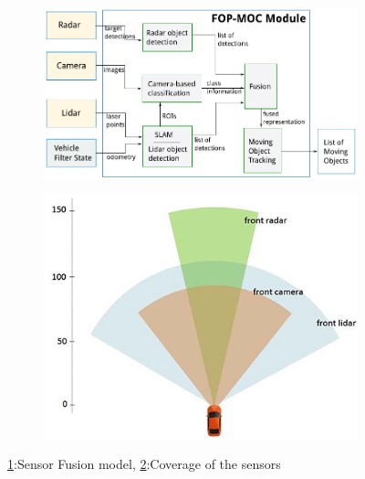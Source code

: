 \begin{figure}
    \centering
    \begin{subfigure}[b]{0.4\textwidth}
        \includegraphics[width=\textwidth]{src/pic/PS.png}
        \caption{}
        \label{fig:PS}
    \end{subfigure}
    \begin{subfigure}[b]{0.4\textwidth}
        \includegraphics[width=\textwidth]{src/pic/sensor_covarage_front.png}
        \caption{}
        \label{fig:sensorcovarage}
    \end{subfigure}
    \caption{\ref{fig:PS}:Sensor Fusion model, \ref{fig:sensorcovarage}:Coverage of the sensors}
    \label{fig:group1}
\end{figure}

